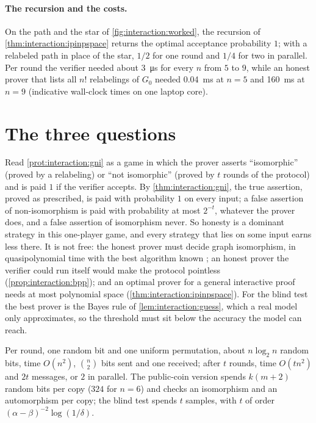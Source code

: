 \begin{refsection}
\paragraph{The recursion and the costs.} On the path and the star of \cref{fig:interaction:worked}, the recursion of \cref{thm:interaction:ipinpspace} returns the optimal acceptance probability $1$; with a relabeled path in place of the star, $1/2$ for one round and $1/4$ for two in parallel. Per round the verifier needed about \SI{3}{\micro\second} for every $n$ from $5$ to $9$, while an honest prover that lists all $n!$ relabelings of $G_0$ needed \SI{0.04}{\milli\second} at $n=5$ and \SI{160}{\milli\second} at $n=9$ (indicative wall-clock times on one laptop core).

\section{The three questions}\label{sec:interaction:questions}

\questionone Read \cref{prot:interaction:gni} as a game in which the prover asserts ``isomorphic'' (proved by a relabeling) or ``not isomorphic'' (proved by $t$ rounds of the protocol) and is paid $1$ if the verifier accepts. By \cref{thm:interaction:gni}, the true assertion, proved as prescribed, is paid with probability $1$ on every input; a false assertion of non-isomorphism is paid with probability at most $2^{-t}$, whatever the prover does, and a false assertion of isomorphism never. So honesty is a dominant strategy in this one-player game, and every strategy that lies on some input earns less there. It is not free: the honest prover must decide graph isomorphism, in quasipolynomial time with the best algorithm known \parencite{Babai2016}; an honest prover the verifier could run itself would make the protocol pointless (\cref{prop:interaction:bpp}); and an optimal prover for a general interactive proof needs at most polynomial space (\cref{thm:interaction:ipinpspace}). For the blind test the best prover is the Bayes rule of \cref{lem:interaction:guess}, which a real model only approximates, so the threshold must sit below the accuracy the model can reach.

\questiontwo Per round, one random bit and one uniform permutation, about $n\log_2n$ random bits, time $O(n^2)$, $\binom n2$ bits sent and one received; after $t$ rounds, time $O(tn^2)$ and $2t$ messages, or $2$ in parallel. The public-coin version spends $k(m+2)$ random bits per copy ($324$ for $n=6$) and checks an isomorphism and an automorphism per copy; the blind test spends $t$ samples, with $t$ of order $(\alpha-\beta)^{-2}\log(1/\delta)$.


\end{refsection}
